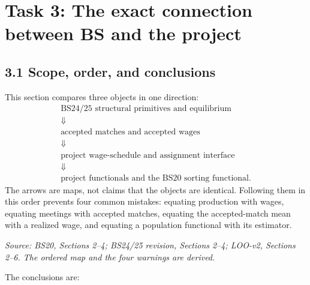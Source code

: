\documentclass[11pt]{article}
\begin{document}
\clearpage
\section{Task 3: The exact connection between BS and the project}

\subsection{3.1 Scope, order, and conclusions}

This section compares three objects in one direction:
\[
\boxed{
\begin{array}{c}
\text{BS24/25 structural primitives and equilibrium}\\
\Downarrow\\
\text{accepted matches and accepted wages}\\
\Downarrow\\
\text{project wage-schedule and assignment interface}\\
\Downarrow\\
\text{project functionals and the BS20 sorting functional}.
\end{array}}
\tag{T3.1}
\]
The arrows are maps, not claims that the objects are identical.  Following
them in this order prevents four common mistakes: equating production with
wages, equating meetings with accepted matches, equating the accepted-match
mean with a realized wage, and equating a population functional with its
estimator.

\textit{Source: BS20, Sections 2--4; BS24/25 revision, Sections 2--4;
LOO-v2, Sections 2--6.  The ordered map and the four warnings are derived.}

The conclusions are:
\end{document}
